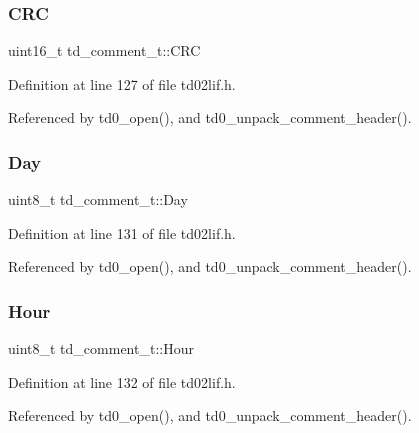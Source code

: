 \subsubsection{\texorpdfstring{C\+RC}{CRC}}
{\footnotesize\ttfamily uint16\+\_\+t td\+\_\+comment\+\_\+t\+::\+C\+RC}



Definition at line 127 of file td02lif.\+h.



Referenced by td0\+\_\+open(), and td0\+\_\+unpack\+\_\+comment\+\_\+header().

\mbox{\label{structtd__comment__t_ab42475ed36aa4475f76336099fd53acc}} 
\subsubsection{\texorpdfstring{Day}{Day}}
{\footnotesize\ttfamily uint8\+\_\+t td\+\_\+comment\+\_\+t\+::\+Day}



Definition at line 131 of file td02lif.\+h.



Referenced by td0\+\_\+open(), and td0\+\_\+unpack\+\_\+comment\+\_\+header().

\mbox{\label{structtd__comment__t_ae42f4895a24dadba8528e32d89d601c6}} 
\subsubsection{\texorpdfstring{Hour}{Hour}}
{\footnotesize\ttfamily uint8\+\_\+t td\+\_\+comment\+\_\+t\+::\+Hour}



Definition at line 132 of file td02lif.\+h.



Referenced by td0\+\_\+open(), and td0\+\_\+unpack\+\_\+comment\+\_\+header().

\mbox{\label{structtd__comment__t_a40d01b0af51b4896e0d771e8a458ed87}} 
